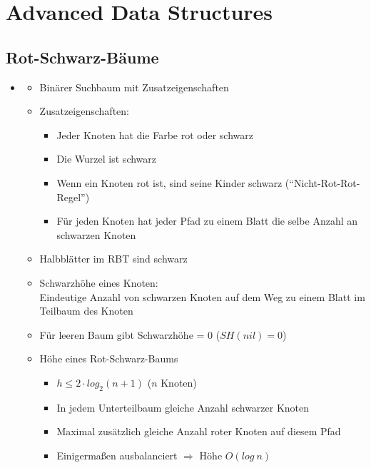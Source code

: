 \documentclass[
    12pt,
    a4paper,
    ngerman,
    color=3b,%
    marginpar=false,
    colorback=false,
    leqno,
]{tudaexercise}
\begin{document}
\section{Advanced Data Structures}\label{Advanced Data Structures}
\subsection{Rot-Schwarz-Bäume}\label{Rot-Schwarz-Baeume}
    \begin{itemize}
        \item {}
            \begin{itemize}
                \item Binärer Suchbaum mit Zusatzeigenschaften
                \item Zusatzeigenschaften:
                    \begin{itemize}
                        \item Jeder Knoten hat die Farbe rot oder schwarz
                        \item Die Wurzel ist schwarz
                        \item Wenn ein Knoten rot ist, sind seine Kinder schwarz ("`Nicht-Rot-Rot-Regel"')
                        \item Für jeden Knoten hat jeder Pfad zu einem Blatt die selbe Anzahl an schwarzen Knoten
                    \end{itemize}
                \item Halbblätter im RBT sind schwarz
                \item Schwarzhöhe eines Knoten: \\
                        Eindeutige Anzahl von schwarzen Knoten auf dem Weg zu einem Blatt im Teilbaum des Knoten
                \item Für leeren Baum gibt Schwarzhöhe = 0 ($SH(nil)=0$)
                \item Höhe eines Rot-Schwarz-Baums
                    \begin{itemize}
                        \item $h \leq 2 \cdot log_2(n+1)$  ($n$ Knoten)
                        \item In jedem Unterteilbaum gleiche Anzahl schwarzer Knoten
                        \item Maximal zusätzlich gleiche Anzahl roter Knoten auf diesem Pfad
                        \item Einigermaßen ausbalanciert $\Rightarrow$ Höhe $O(log~n)$

\end{itemize}
\end{itemize}
\end{itemize}
\end{document}
